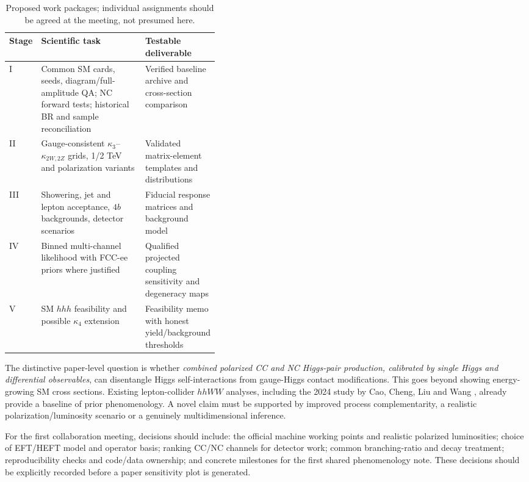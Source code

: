 \documentclass[12pt,a4paper]{article}
\begin{document}
\begin{table}[H]\centering\small\caption{Proposed work packages; individual assignments should be agreed at the meeting, not presumed here.}
\begin{tabularx}{\linewidth}{@{}p{0.13\linewidth}X p{0.27\linewidth}@{}}\toprule
Stage & Scientific task & Testable deliverable\\\midrule
I & Common SM cards, seeds, diagram/full-amplitude QA; NC forward tests; historical BR and sample reconciliation & Verified baseline archive and cross-section comparison\\
II & Gauge-consistent $\kappa_3$--$\kappa_{2W,2Z}$ grids, 1/2 TeV and polarization variants & Validated matrix-element templates and distributions\\
III & Showering, jet and lepton acceptance, $4b$ backgrounds, detector scenarios & Fiducial response matrices and background model\\
IV & Binned multi-channel likelihood with FCC-ee priors where justified & Qualified projected coupling sensitivity and degeneracy maps\\
V & SM $hhh$ feasibility and possible $\kappa_4$ extension & Feasibility memo with honest yield/background thresholds\\\bottomrule
\end{tabularx}\end{table}
The distinctive paper-level question is whether \emph{combined polarized CC and NC Higgs-pair production, calibrated by single Higgs and differential observables}, can disentangle Higgs self-interactions from gauge-Higgs contact modifications. This goes beyond showing energy-growing SM cross sections. Existing lepton-collider $hhWW$ analyses, including the 2024 study by Cao, Cheng, Liu and Wang \cite{cao}, already provide a baseline of prior phenomenology. A novel claim must be supported by improved process complementarity, a realistic polarization/luminosity scenario or a genuinely multidimensional inference.

For the first collaboration meeting, decisions should include: the official machine working points and realistic polarized luminosities; choice of EFT/HEFT model and operator basis; ranking CC/NC channels for detector work; common branching-ratio and decay treatment; reproducibility checks and code/data ownership; and concrete milestones for the first shared phenomenology note. These decisions should be explicitly recorded before a paper sensitivity plot is generated.
\end{document}
